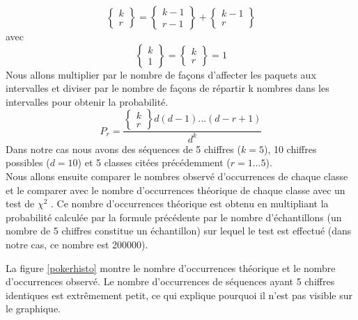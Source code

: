 \documentclass[10pt,a4paper]{article}
\begin{document}
\begin{equation*}
\begin{Bmatrix}
k\\
r
\end{Bmatrix}
=
\begin{Bmatrix}
k-1\\
r-1
\end{Bmatrix}
+
\begin{Bmatrix}
k-1\\
r
\end{Bmatrix}
\end{equation*}
avec 
\begin{equation*}
\begin{Bmatrix}
k\\
1
\end{Bmatrix}
=
\begin{Bmatrix}
k\\
r
\end{Bmatrix}
=
1
\end{equation*}
Nous allons multiplier par le nombre de façons d'affecter les paquets aux intervalles et diviser par le nombre de façons de répartir k nombres dans les intervalles pour obtenir la probabilité.\\
\begin{equation*}
P_r = 
\frac{\begin{Bmatrix}
k\\
r
\end{Bmatrix}d(d-1) ...(d-r+1)}{d^k}
\end{equation*}
\newline
Dans notre cas nous avons des séquences de 5 chiffres ($k=5$), 10 chiffres possibles ($d=10$) et 5 classes citées précédemment ($r = 1...5$).\\
Nous allons ensuite comparer le nombres observé d'occurrences de chaque classe et le comparer avec le nombre d'occurrences théorique de chaque classe avec un test de $\chi^2$ . Ce nombre d'occurrences théorique est obtenu en multipliant la probabilité calculée par la formule précédente par le nombre d'échantillons (un nombre de 5 chiffres constitue un échantillon) sur lequel le test est effectué (dans notre cas, ce nombre est 200000). \newline

La figure \ref{pokerhisto} montre le nombre d'occurrences théorique et le nombre d'occurrences observé. Le nombre d'occurrences de séquences ayant 5 chiffres identiques est extrêmement petit, ce qui explique pourquoi il n'est pas visible sur le graphique.\\
\end{document}
